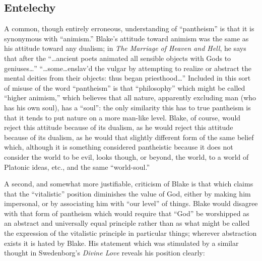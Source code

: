 \label{self:25}

\subsection{Entelechy}

A common, though entirely erroneous, understanding of \enquote{pantheism} is that it is synonymous with \enquote{animism.} Blake's
attitude toward animism was the same as his attitude toward any dualism; in \emph{The Marriage of Heaven and Hell}, he says
that after the \enquote{\dots ancient poets animated all sensible objects with Gods to geniuses\dots} \enquote{\dots some\dots enslav'd the vulgar
by attempting to realize or abstract the mental deities from their objects: thus began priesthood\dots}\supercite{keynes:william-blake}
Included in this sort of misuse of the word \enquote{pantheism} is that \enquote{philosophy} which might be called \enquote{higher animism,} which believes that all nature,
apparently excluding man (who has his own soul), has a \enquote{soul}: the only similarity this has to true pantheism is that it
tends to put nature on a more man-like level. Blake, of course, would reject this attitude because of its dualism, as he would
reject this attitude because of its dualism, as he would that slightly different form of the same belief which, although
it is something considered pantheistic because it does not consider the world to be evil, looks though, or beyond,
the world, to a world of Platonic ideas, etc., and the same \enquote{world-soul.}

A second, and somewhat more justifiable, criticism of Blake is that which claims that the \enquote{vitalistic} position diminishes
the value of God, either by making him impersonal, or by associating him with \enquote{our level} of things. Blake would
disagree with that form of pantheism which would require that \enquote{God} be worshipped as an abstract and universally equal principle
rather than as what might be called the expression of the vitalistic principle in particular
things; wherever abstraction exists it is hated by Blake. His statement which was stimulated by a similar thought in
Swedenborg's \emph{Divine Love} reveals his position clearly:


